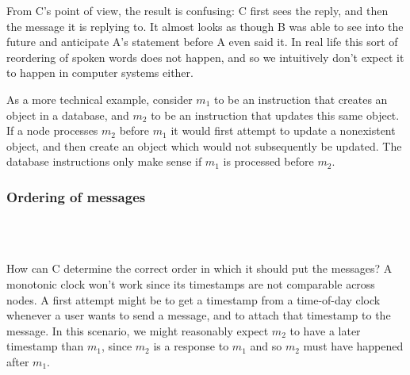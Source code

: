From C's point of view, the result is confusing: C first sees the reply, and then the message it is replying to.
It almost looks as though B was able to see into the future and anticipate A's statement before A even said it.
In real life this sort of reordering of spoken words does not happen, and so we intuitively don't expect it to happen in computer systems either.

As a more technical example, consider $m_1$ to be an instruction that creates an object in a database, and $m_2$ to be an instruction that updates this same object.
If a node processes $m_2$ before $m_1$ it would first attempt to update a nonexistent object, and then create an object which would not subsequently be updated.
The database instructions only make sense if $m_1$ is processed before $m_2$.

\begin{frame}
    \label{s:moon-cheese}
    \frametitle{Ordering of messages}
    \begin{center}
    \end{center}
    \\
    \\[1em]%
\end{frame}
\label{l:moon-cheese}

How can C determine the correct order in which it should put the messages?
A monotonic clock won't work since its timestamps are not comparable across nodes.
A first attempt might be to get a timestamp from a time-of-day clock whenever a user wants to send a message, and to attach that timestamp to the message.
In this scenario, we might reasonably expect $m_2$ to have a later timestamp than $m_1$, since $m_2$ is a response to $m_1$ and so $m_2$ must have happened after $m_1$.

